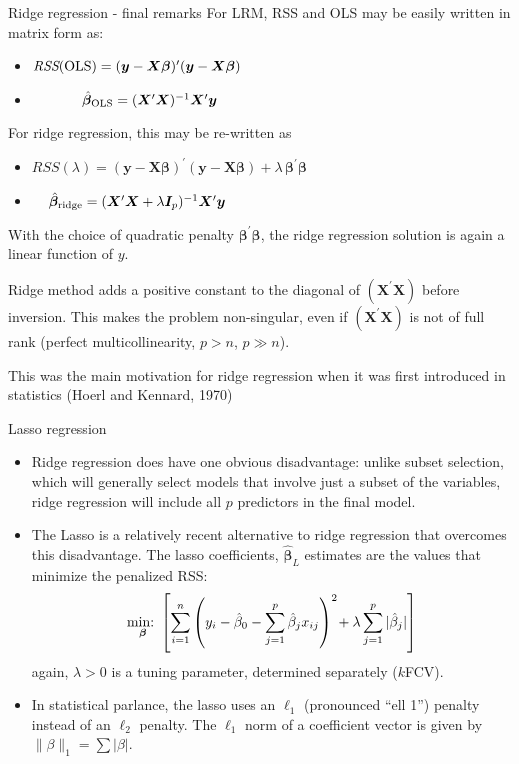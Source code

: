 \documentclass{beamer}
\begin{document}
\begin{frame}{Ridge regression - final remarks}
For LRM, RSS and OLS may be easily written in matrix form as:
\begin{itemize}
\item $\textit{RSS}(\textnormal{OLS}) = (\bm{y}-\bm{X\beta})^{\prime}(\bm{y}-\bm{X\beta})$
\item ~~~~~~~$\hat{\bm{\beta}}_{\textnormal{OLS}} = (\bm{X}^{\prime}\bm{X})^{-1}\bm{X}^{\prime}\bm{y}$ 
\end{itemize}
For ridge regression, this may be re-written as
\begin{itemize}
\item $\textit{RSS}(\lambda) = (\bm{y}-\bm{X\beta})^{\prime}(\bm{y}-\bm{X\beta}) 
+ \lambda \,\bm{\beta}^{\prime} \!\bm{\beta}$
\item ~~$\,\hat{\bm{\beta}}_{\textnormal{ridge}} = (\bm{X}^{\prime}\bm{X} + \lambda \bm{I}_p )^{-1}\bm{X}^{\prime}\bm{y}$ 
\end{itemize}

With the choice of quadratic penalty $\bm{\beta}^{\prime} \!\bm{\beta}$, the ridge regression solution is again a linear function of $y$. 

\medskip
Ridge method adds a positive constant to the diagonal of $(\bm{X}^{\prime}\bm{X})$ before inversion. This makes the problem non-singular, even if $(\bm{X}^{\prime}\bm{X})$ is not of full rank (perfect multicollinearity, $p>n$, $p \gg n$).

\medskip
This was the main motivation for ridge regression when it was first introduced in statistics (Hoerl and Kennard, 1970)

\end{frame}
\begin{frame}{Lasso regression}
\begin{itemize}
\item Ridge regression does have one obvious disadvantage:
unlike subset selection, which will generally select models
that involve just a subset of the variables, ridge regression
will include all $p$ predictors in the final model.
\medskip
\item The Lasso is a relatively recent alternative to ridge
regression that overcomes this disadvantage. The lasso
coefficients,  $\bm{\hat{\beta}}_{\!L}$ estimates 
are the values that minimize the penalized RSS:
$$
\underset{\bm{\beta}}{\textnormal{min:~}} 
\left[
\sum_{i=1}^n \left(y_i - \hat{\beta}_0 
- \sum_{j=1}^p  \hat{\beta}_j x_{ij} \right)^2 
\! + \lambda \sum_{j=1}^p  | \hat{\beta}_j | \right]$$
again, $\lambda > 0$ is a tuning parameter, determined separately ($k$FCV).
\item In statistical parlance, the lasso uses an $\ell_1$ (pronounced ``ell 1'') penalty instead of an $\ell_2$ penalty. The $\ell_1$ norm of a coefficient vector  is given by 
$\| \beta \|_1 = \sum | \beta |$.
\end{itemize}
\end{frame}
\end{document}
